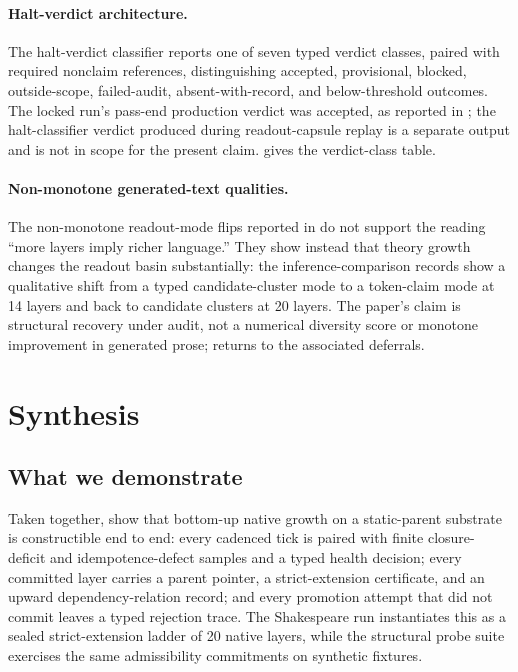 \documentclass{article}
\theoremstyle{definition}
\begin{document}
\paragraph{Halt-verdict architecture.}\label{subsec:halt-architecture}
The halt-verdict classifier reports one of seven typed verdict classes, paired with required nonclaim references, distinguishing accepted, provisional, blocked, outside-scope, failed-audit, absent-with-record, and below-threshold outcomes. The locked run's pass-end production verdict was accepted, as reported in ; the halt-classifier verdict produced during readout-capsule replay is a separate output and is not in scope for the present claim.  gives the verdict-class table.

\paragraph{Non-monotone generated-text qualities.}\label{subsec:non-monotone}
The non-monotone readout-mode flips reported in  do not support the reading ``more layers imply richer language.'' They show instead that theory growth changes the readout basin substantially: the inference-comparison records show a qualitative shift from a typed candidate-cluster mode to a token-claim mode at 14 layers and back to candidate clusters at 20 layers. The paper's claim is structural recovery under audit, not a numerical diversity score or monotone improvement in generated prose;  returns to the associated deferrals.
 \setcounter{section}{8}                     \section{Synthesis}\label{sec:synthesis}

\subsection{What we demonstrate}\label{subsec:demonstrate}

Taken together,  show that bottom-up native growth on a static-parent substrate is constructible end to end: every cadenced tick is paired with finite closure-deficit and idempotence-defect samples and a typed health decision; every committed layer carries a parent pointer, a strict-extension certificate, and an upward dependency-relation record; and every promotion attempt that did not commit leaves a typed rejection trace. The Shakespeare run instantiates this as a sealed strict-extension ladder of 20 native layers, while the structural probe suite exercises the same admissibility commitments on synthetic fixtures.
\end{document}
